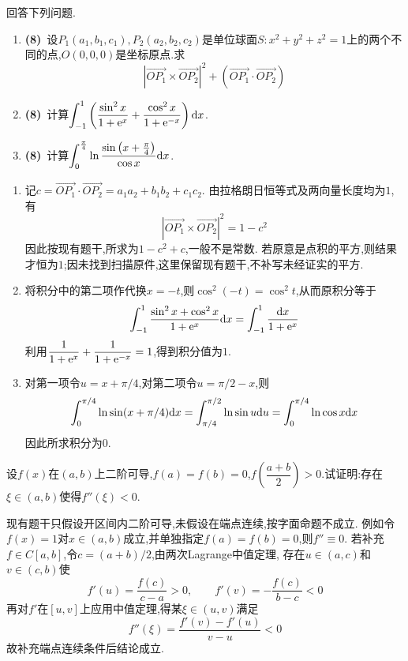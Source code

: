 \documentclass{ctexart}
\begin{document}
\begin{problem}[4.(24\songti{分})]
回答下列问题.
        \begin{enumerate}[label=\tbf{(\arabic*)}]
            \item \textbf{(8)}\ 设$P_1(a_1,b_1,c_1),P_2(a_2,b_2,c_2)$是单位球面$S:x^2+y^2+z^2=1$上的两个不同的点,$O(0,0,0)$是坐标原点.求\[\left|\overrightarrow{OP_1}\times\overrightarrow{OP_2}\right|^2+\left(\overrightarrow{OP_1}\cdot\overrightarrow{OP_2}\right)\]
            \item \textbf{(8)}\ 计算$\displaystyle\int_{-1}^1\left(\dfrac{\sin^2x}{1+\mathrm{e}^x}+\dfrac{\cos^2x}{1+\mathrm{e}^{-x}}\right)\mathrm{d} x$.
            \item \textbf{(8)}\ 计算\(\displaystyle\int_{0}^{\frac{\pi}{4}}\ln\dfrac{\sin\left(x+\frac\pi4\right)}{\cos x}\mathrm{d} x\).
        \end{enumerate}
\end{problem}
\begin{solution}
\begin{enumerate}[label=\tbf{(\arabic*)},leftmargin=*]
\item 记$c=\overrightarrow{OP_1}\cdot\overrightarrow{OP_2}=a_1a_2+b_1b_2+c_1c_2$.
由拉格朗日恒等式及两向量长度均为$1$,有
\[|\overrightarrow{OP_1}\times\overrightarrow{OP_2}|^2=1-c^2\]
因此按现有题干,所求为$1-c^2+c$,一般不是常数.
若原意是点积的平方,则结果才恒为$1$;因未找到扫描原件,这里保留现有题干,不补写未经证实的平方.
\item 将积分中的第二项作代换$x=-t$,则$\cos^2(-t)=\cos^2t$,从而原积分等于
\[\int_{-1}^1\dfrac{\sin^2x+\cos^2x}{1+\mathrm{e}^x}\mathrm{d} x
=\int_{-1}^1\dfrac{\mathrm{d} x}{1+\mathrm{e}^x}\]
利用$\dfrac1{1+\mathrm{e}^x}+\dfrac1{1+\mathrm{e}^{-x}}=1$,得到积分值为$1$.
\item 对第一项令$u=x+\pi/4$,对第二项令$u=\pi/2-x$,则
\[\int_0^{\pi/4}\ln\sin(x+\pi/4)\mathrm{d} x
=\int_{\pi/4}^{\pi/2}\ln\sin u\mathrm{d} u
=\int_0^{\pi/4}\ln\cos x\mathrm{d} x\]
因此所求积分为$0$.
\end{enumerate}
\end{solution}
\begin{problem}[5.(8\songti{分})]
设$f(x)$在$(a,b)$上二阶可导,$f(a)=f(b)=0$,$f\left(\dfrac{a+b}{2}\right)>0$.试证明:存在$\xi\in(a,b)$使得$f''(\xi)<0$.
\end{problem}
\begin{solution}
现有题干只假设开区间内二阶可导,未假设在端点连续,按字面命题不成立.
例如令$f(x)=1$对$x\in(a,b)$成立,并单独指定$f(a)=f(b)=0$,则$f''\equiv0$.
若补充$f\in C[a,b]$,令$c=(a+b)/2$,由两次Lagrange中值定理,
存在$u\in(a,c)$和$v\in(c,b)$使
\[f'(u)=\dfrac{f(c)}{c-a}>0,\qquad f'(v)=-\dfrac{f(c)}{b-c}<0\]
再对$f'$在$[u,v]$上应用中值定理,得某$\xi\in(u,v)$满足
\[f''(\xi)=\dfrac{f'(v)-f'(u)}{v-u}<0\]
故补充端点连续条件后结论成立.
\end{solution}
\end{document}
